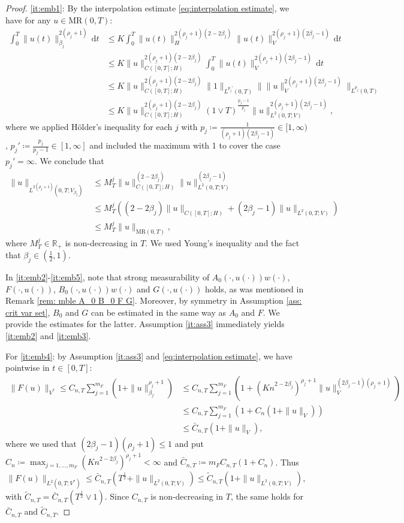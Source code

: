 \documentclass{amsart}
\newcommand{\dd}{\,\mathrm{d}}
\renewcommand{\MR}{\mathrm{MR}}
\newcommand{\<}{\langle}
\newcommand{\?}{\rangle}
\theoremstyle{plain}
\theoremstyle{remark}
\theoremstyle{plain}
\numberwithin{equation}{section}
\def\R{{\mathbb R}}
\begin{document}
\begin{proof}
\ref{it:emb1}: By the interpolation estimate \eqref{eq:interpolation estimate}, we have for any $u\in \MR(0,T)$:
\begin{align*}
\int_0^{T} \|u(t)\|_{\beta_j}^{2(\rho_j+1)}\dd t&\leq K \int_0^{T} \|u(t)\|_{H}^{2(\rho_j+1)(2-2\beta_j)}\|u(t)\|_{V}^{2(\rho_j+1)(2\beta_j-1)}\dd t\\
&\leq K \|u\|_{C([0,T];H)}^{2(\rho_j+1)(2-2\beta_j)}\int_0^{T}\|u(t)\|_{V}^{2(\rho_j+1)(2\beta_j-1)}\dd t\\
&\leq K \|u\|_{C([0,T];H)}^{2(\rho_j+1)(2-2\beta_j)}\|1\|_{L^{p_j'}(0,T)}\|\|u\|_V^{2(\rho_j+1)(2\beta_j-1)}\|_{L^{p_j}(0,T)}\\
&\leq K \|u\|_{C([0,T];H)}^{2(\rho_j+1)(2-2\beta_j)}(1\vee T)^{\frac{p_j-1}{p_j}}\|u\|_{L^2(0,T;V)}^{2(\rho_j+1)(2\beta_j-1)},
\end{align*}
where we applied H\"older's inequality for each $j$ with $p_j\coloneqq \frac{1}{(\rho_j+1)(2\beta_j-1)}\in[1,\infty)$, $p_j'\coloneqq \frac{p_j}{p_j-1}\in[1,\infty]$ and included the maximum with 1 to cover the case $p_j'=\infty$.
We conclude that
\begin{align*}
  \|u\|_{L^{2(\rho_j+1)}(0,T;V_{\beta_j})}&\leq M_{T}^j\|u\|_{C([0,T];H)}^{(2-2\beta_j)}\|u\|_{L^2(0,T;V)}^{(2\beta_j-1)}\\
  &\leq M_{T}^j \left((2-2\beta_j)\|u\|_{C([0,T];H)}+(2\beta_j-1)\|u\|_{L^2(0,T;V)}\right)\\
  &\leq M_{T}^j \|u\|_{\MR(0,T)},
\end{align*}
where $M_{T}^j\in\R_+$ is non-decreasing in $T$. We used  Young's inequality and the fact that $\beta_j\in(\frac{1}{2},1)$.

In \ref{it:emb2}-\ref{it:emb5}, note that strong measurability of $A_0(\cdot,u(\cdot))w(\cdot)$, $F(\cdot,u(\cdot))$, $B_0(\cdot,u(\cdot))w(\cdot)$ and $G(\cdot,u(\cdot))$ holds, as was mentioned in Remark \ref{rem: mble A_0 B_0 F G}.
Moreover, by symmetry in Assumption \ref{ass: crit var set}, $B_0$ and $G$ can be estimated in the same way as $A_0$ and $F$. We provide the estimates for the latter.
Assumption \ref{it:ass3}  immediately yields \ref{it:emb2} and \ref{it:emb3}.

For
\ref{it:emb4}: by Assumption \ref{it:ass3} and \eqref{eq:interpolation estimate}, we have pointwise in $t\in[0,T]$:
\begin{align*}
\|F(u)\|_{V^*}\leq C_{n,T}\sum_{j=1}^{m_F}(1+\|u\|_{\beta_j}^{\rho_j+1})&\leq C_{n,T}\sum_{j=1}^{m_F}(1+(Kn^{2-2\beta_j})^{\rho_j+1}\|u\|_{V}^{(2\beta_j-1)(\rho_j+1)})\\
&\leq {C}_{n,T}\sum_{j=1}^{m_F}(1+C_n(1+\|u\|_{V})) \\
&\leq \bar{C}_{n,T}(1+\|u\|_{V}),
\end{align*}
where we used that $(2\beta_j-1)(\rho_j+1)\leq 1$ and put $C_n\coloneqq  \max_{j=1,\ldots,m_F} (Kn^{2-2\beta_j})^{\rho_j+1}<\infty$ and $\bar{C}_{n,T}\coloneqq m_F C_{n,T}(1+C_n)$.
Thus
\[
\|F(u)\|_{L^2(0,T;V^*)}\leq \bar{C}_{n,T}(T^{\frac{1}{2}}+\|u\|_{L^2(0,T;V)}) \leq \tilde{C}_{n,T}(1+\|u\|_{L^2(0,T;V)}),
\]
with $\tilde{C}_{n,T}=\bar{C}_{n,T}(T^{\frac{1}{2}}\vee 1)$.
Since ${C}_{n,T}$ is non-decreasing in $T$, the same holds for $\bar{C}_{n,T}$ and $\tilde{C}_{n,T}$.


\end{proof}
\end{document}
